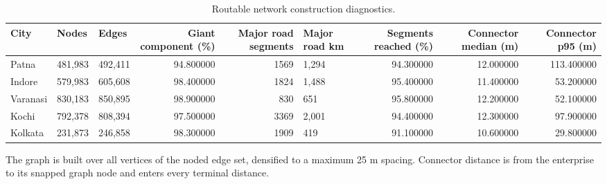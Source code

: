 \begin{table}[htbp]
\centering
\small
\caption{Routable network construction diagnostics.}
\label{tab:s6_network}
\begin{tabular}{lllrrlrrr}
\toprule
City & Nodes & Edges & Giant component (\%) & Major road segments & Major road km & Segments reached (\%) & Connector median (m) & Connector p95 (m) \\
\midrule
Patna & 481,983 & 492,411 & 94.800000 & 1569 & 1,294 & 94.300000 & 12.000000 & 113.400000 \\
Indore & 579,983 & 605,608 & 98.400000 & 1824 & 1,488 & 95.400000 & 11.400000 & 53.200000 \\
Varanasi & 830,183 & 850,895 & 98.900000 & 830 & 651 & 95.800000 & 12.200000 & 52.100000 \\
Kochi & 792,378 & 808,394 & 97.500000 & 3369 & 2,001 & 94.400000 & 12.300000 & 97.900000 \\
Kolkata & 231,873 & 246,858 & 98.300000 & 1909 & 419 & 91.100000 & 10.600000 & 29.800000 \\
\bottomrule
\end{tabular}
\begin{tablenotes}\footnotesize
\item The graph is built over all vertices of the noded edge set, densified to a maximum 25 m spacing. Connector distance is from the enterprise to its snapped graph node and enters every terminal distance.
\end{tablenotes}
\end{table}
